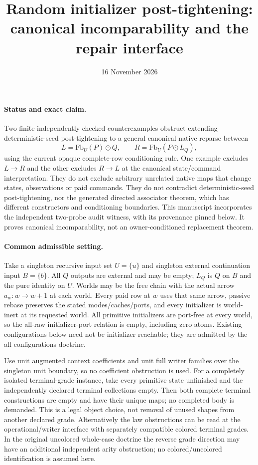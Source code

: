 \documentclass[11pt]{article}\usepackage{amsmath,amssymb,geometry}\geometry{margin=1in}
\title{Random initializer post-tightening: canonical incomparability and the repair interface}
\date{16 November 2026}
\begin{document}
\maketitle
\paragraph{Status and exact claim.} Two finite independently checked counterexamples obstruct extending deterministic-seed post-tightening to a general canonical native reparse between
\[
L=\mathrm{Fb}_U(P)\odot Q,\qquad
R=\mathrm{Fb}_U(P\odot L_Q),
\]
using the current opaque complete-row conditioning rule. One example excludes $L\to R$ and the other excludes $R\to L$ at the canonical state/command interpretation. They do not exclude arbitrary unrelated native maps that change states, observations or paid commands. They do not contradict deterministic-seed post-tightening, nor the generated directed associator theorem, which has different constructors and conditioning boundaries. This manuscript incorporates the independent two-probe audit witness, with its provenance pinned below. It proves canonical incomparability, not an owner-conditioned replacement theorem.

\paragraph{Common admissible setting.} Take a singleton recursive input set $U=\{u\}$ and singleton external continuation input $B=\{b\}$. All $Q$ outputs are external and may be empty; $L_Q$ is $Q$ on $B$ and the pure identity on $U$. Worlds may be the free chain with the actual arrow $a_w:w\to w+1$ at each world. Every paid row at $w$ uses that same arrow, passive rebase preserves the stated modes/caches/ports, and every initializer is world-inert at its requested world. All primitive initializers are port-free at every world, so the all-raw initializer-port relation is empty, including zero atoms. Existing configurations below need not be initializer reachable; they are admitted by the all-configurations doctrine.

Use unit augmented context coefficients and unit full writer families over the singleton unit boundary, so no coefficient obstruction is used. For a completely isolated terminal-grade instance, take every primitive state unfinished and the independently declared terminal collections empty. Then both complete terminal constructions are empty and have their unique maps; no completed body is demanded. This is a legal object choice, not removal of unused shapes from another declared grade. Alternatively the law obstructions can be read at the operational/writer interface with separately compatible colored terminal grades. In the original uncolored whole-case doctrine the reverse grade direction may have an additional independent arity obstruction; no colored/uncolored identification is assumed here.
\end{document}
